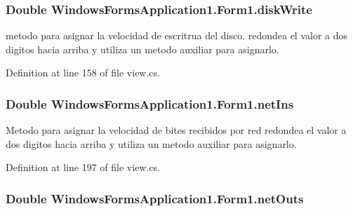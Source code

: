 \subsubsection[{disk\+Write}]{\setlength{\rightskip}{0pt plus 5cm}Double Windows\+Forms\+Application1.\+Form1.\+disk\+Write\hspace{0.3cm}{\ttfamily [set]}}\label{class_windows_forms_application1_1_1_form1_a21165d5313e265bc99107b4bcb60cdad}


metodo para asignar la velocidad de escritrua del disco. redondea el valor a dos digitos hacia arriba y utiliza un metodo auxiliar para asignarlo. 



Definition at line 158 of file view.\+cs.

\hypertarget{class_windows_forms_application1_1_1_form1_ad6c6884d7846134ca9a860197d7ea0b6}{}
\subsubsection[{net\+Ins}]{\setlength{\rightskip}{0pt plus 5cm}Double Windows\+Forms\+Application1.\+Form1.\+net\+Ins\hspace{0.3cm}{\ttfamily [set]}}\label{class_windows_forms_application1_1_1_form1_ad6c6884d7846134ca9a860197d7ea0b6}


Metodo para asignar la velocidad de bites recibidos por red redondea el valor a dos digitos hacia arriba y utiliza un metodo auxiliar para asignarlo. 



Definition at line 197 of file view.\+cs.

\hypertarget{class_windows_forms_application1_1_1_form1_a50fa7fa857eb7587ab11e7b2c502f240}{}
\subsubsection[{net\+Outs}]{\setlength{\rightskip}{0pt plus 5cm}Double Windows\+Forms\+Application1.\+Form1.\+net\+Outs\hspace{0.3cm}{\ttfamily [set]}}\label{class_windows_forms_application1_1_1_form1_a50fa7fa857eb7587ab11e7b2c502f240}


